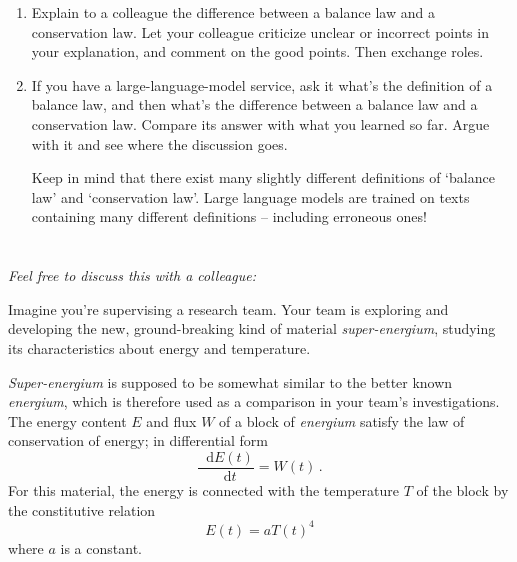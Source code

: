 \documentclass[a4paper,12pt,%
onecolumn,oneside,%
british%
]{memoir}
\newcommand*{\di}{\mathop{}\!\mathrm{d}}%
\renewcommand*{\|}[1][]{\nonscript\:#1\vert\nonscript\:\mathopen{}}
\newcommand*{\dt}{\di t}
\newcommand*{\yE}{E}
\newcommand*{\yH}{W}
\newcommand*{\yT}{T}%
\begin{document}
\smallskip

\begin{enumerate}[exerc]
\item Explain to a colleague the difference between a balance law and a conservation law. Let your colleague criticize unclear or incorrect points in your explanation, and comment on the good points. Then exchange roles.
\item If you have a large-language-model service, ask it what's the definition of a balance law, and then what's the difference between a balance law and a conservation law. Compare its answer with what you learned so far. Argue with it and see where the discussion goes.\nopagebreak

  Keep in mind that there exist many slightly different definitions of \enquote*{balance law} and \enquote*{conservation law}.  Large language models are trained on texts containing many different definitions -- including erroneous ones!
\end{enumerate}








\section{}\label{sec:change_bal_or_const}

\emph{Feel free to discuss this with a colleague:}

\smallskip

Imagine you're supervising a research team. Your team is exploring and developing the new, ground-breaking kind of material \emph{super-energium}, studying its characteristics about energy and temperature.

\emph{Super-energium} is supposed to be somewhat similar to the better known \emph{energium}, which is therefore used as a comparison in your team's investigations. The energy content $\yE$ and flux $\yH$ of a block of \emph{energium} satisfy the law of conservation of energy; in differential form
\begin{equation}\label{eq:energy_block}
  \frac{\di\yE(t)}{\dt} = \yH(t) \,.
\end{equation}
For this material, the energy is connected with the temperature $\yT$ of the block by the constitutive relation
\begin{equation}\label{eq:const_block}
  \yE(t) = a \yT(t)^{4}
\end{equation}
where $a$ is a constant.
\end{document}
